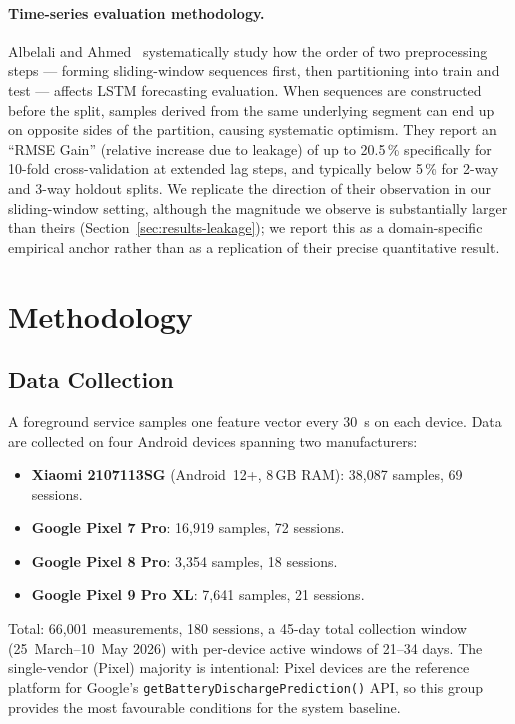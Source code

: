 \documentclass[conference]{IEEEtran}
\begin{document}
\paragraph{Time-series evaluation methodology.}
Albelali and Ahmed~\cite{albelali2025hidden} systematically study how
the order of two preprocessing steps --- forming sliding-window
sequences first, then partitioning into train and test --- affects
LSTM forecasting evaluation. When sequences are constructed before
the split, samples derived from the same underlying segment can end
up on opposite sides of the partition, causing systematic optimism.
They report an ``RMSE Gain'' (relative increase due to leakage) of
up to 20.5\,\% specifically for 10-fold cross-validation at extended
lag steps, and typically below 5\,\% for 2-way and 3-way holdout splits. We replicate the
direction of their observation in our sliding-window setting,
although the magnitude we observe is substantially larger than theirs
(Section~\ref{sec:results-leakage}); we report this as a
domain-specific empirical anchor rather than as a replication of
their precise quantitative result.

\section{Methodology}
\label{sec:method}

\subsection{Data Collection}
A foreground service samples one feature vector every \SI{30}{\second}
on each device. Data are collected on four Android devices spanning
two manufacturers:
\begin{itemize}
\item \textbf{Xiaomi 2107113SG} (Android~12+, 8\,GB RAM): 38{,}087
samples, 69 sessions.
\item \textbf{Google Pixel 7 Pro}: 16{,}919 samples, 72 sessions.
\item \textbf{Google Pixel 8 Pro}: 3{,}354 samples, 18 sessions.
\item \textbf{Google Pixel 9 Pro XL}: 7{,}641 samples, 21 sessions.
\end{itemize}
Total: 66{,}001 measurements, 180 sessions, a 45-day total collection
window (25~March--10~May 2026) with per-device active windows of
21--34 days. The single-vendor (Pixel) majority is intentional: Pixel
devices are the reference platform for Google's
\texttt{getBatteryDischargePrediction()} API, so this group provides
the most favourable conditions for the system baseline.
\end{document}
